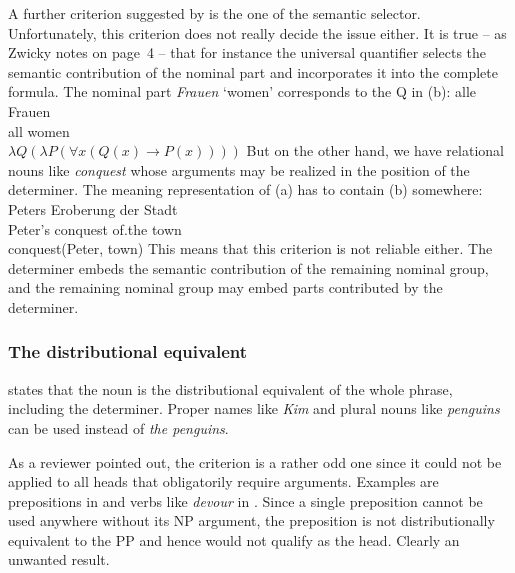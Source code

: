 \documentclass[output=paper
  ,nobabel
  ,draftmode
  ,uniformtopskip %
  ,colorlinks, citecolor=brown
]{langscibook}
\begin{document}
A further criterion suggested by \citet[Section~2.1.1]{Zwicky85a} is the one of the semantic
selector. Unfortunately, this criterion does not really decide the issue either. It is true -- as
Zwicky notes on page~4 -- that for instance the universal quantifier selects the semantic contribution
of the nominal part and incorporates it into the complete formula. The nominal part \emph{Frauen}
`women' corresponds to the Q in (b):
\eal
\ex 
\gll alle Frauen\\
     all  women\\
\ex $\lambda Q (\lambda P(\forall x(Q(x) \rightarrow P(x))))$
\zl
But on the other hand, we have relational nouns like \emph{conquest} whose arguments may be realized in the position of
the determiner. The meaning representation of (a) has to contain (b) somewhere:
\eal
\ex 
\gll Peters Eroberung der Stadt\\
     Peter's conquest of.the town\\
\ex conquest(Peter, town)
\zl 
This means that this criterion is not reliable either. The determiner embeds the semantic
contribution of the remaining nominal group, and the remaining nominal group may embed parts
contributed by the determiner.

\subsubsection{The distributional equivalent}

\citet[]{Zwicky85a} states that the noun is the distributional equivalent of the whole
phrase, including the determiner. Proper names like \emph{Kim} and plural nouns like \emph{penguins}
can be used instead of \emph{the penguins}. 


As a reviewer pointed out, the criterion is a rather odd one since it could not be
applied to all heads that obligatorily require arguments. Examples are prepositions in  and
verbs like \emph{devour} in . Since a single preposition cannot be used anywhere without its
NP argument, the preposition is not distributionally equivalent to the PP and hence would not
qualify as the head. Clearly an unwanted result.
\end{document}

